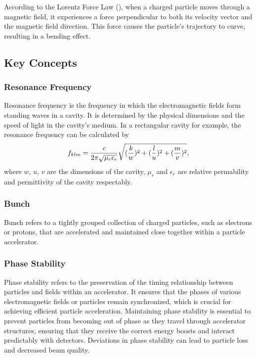 \documentclass{article}
\begin{document}
According to the Lorentz Force Law (), when a charged particle moves through a magnetic field, it experiences a force perpendicular to both its velocity 
vector and the magnetic field direction. This force causes the particle's trajectory to curve, resulting in a bending effect.


\subsection{Key Concepts}

\subsubsection{Resonance Frequency}
Resonance frequency is the frequency in which the electromagnetic fields form standing waves in a cavity.
It is determined by the physical dimensions and the speed of light in the cavity's medium. 
In a rectangular cavity for example, the resonance frequency can be calculated by
\vspace{-10pt}\begin{equation}
    f_{klm} = \frac{c}{2\pi \sqrt{\mu_r \epsilon_r}} \sqrt{(\frac{k}{w})^2 + (\frac{l}{u})^2 + (\frac{m}{v})^2}  ,
    \label{eq:f_r_rec}
\vspace{-10pt}\end{equation}
where $w$, $u$, $v$ are the dimensions of the cavity, $\mu_r$ and $\epsilon_r$ are relative permability and permittivity of the cavity respectably.

\subsubsection{Bunch}
Bunch refers to a tightly grouped collection of charged particles, such as electrons or protons, that are accelerated and maintained close together within a particle accelerator.

\subsubsection{Phase Stability}
Phase stability refers to the preservation of the timing relationship between particles and fields within an accelerator. 
It ensures that the phases of various electromagnetic fields or particles remain synchronized, 
which is crucial for achieving efficient particle acceleration. 
Maintaining phase stability is essential to prevent particles from becoming out of phase as they travel through accelerator structures, 
ensuring that they receive the correct energy boosts and interact predictably with detectors. 
Deviations in phase stability can lead to particle loss and decreased beam quality.
\end{document}
